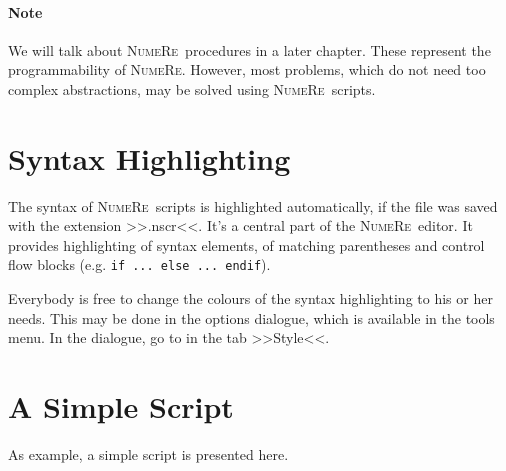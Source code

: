 \documentclass[DIV=14,headsepline,footsepline]{scrbook}
\newcommand{\NR}{\textsc{Nu\-me\-Re}}
\begin{document}
				\paragraph{Note}
					We will talk about \NR\ procedures in a later chapter. These represent the programmability of \NR. However, most problems, which do not need too complex abstractions, may be solved using \NR\ scripts.
				
			\section{Syntax Highlighting}
				The syntax of \NR\ scripts is highlighted automatically, if the file was saved with the extension >>.nscr<<. It's a central part of the \NR\ editor. It provides highlighting of syntax elements, of matching parentheses and control flow blocks (e.g. \lstinline+if ... else ... endif+).
				
				Everybody is free to change the colours of the syntax highlighting to his or her needs. This may be done in the options dialogue, which is available in the tools menu. In the dialogue, go to in the tab >>Style<<. 
			\section{A Simple Script}
				As example, a simple script is presented here.
				
\end{document}
